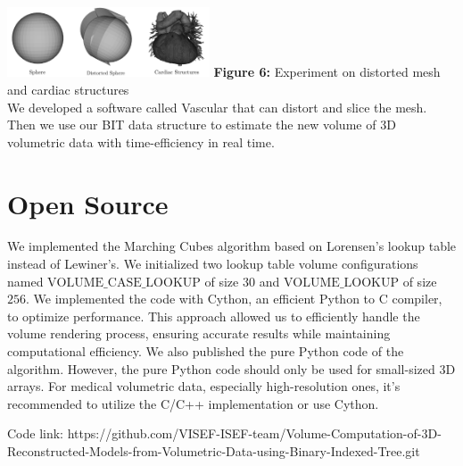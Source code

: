 \documentclass[11pt]{article}
\begin{document}
\begin{multicols}{2}
\includegraphics[width=0.45\textwidth]{Figures/Experiment.png}
\textbf{Figure 6:} Experiment on distorted mesh and cardiac structures \\

We developed a software called Vascular \cite{vascular} that can distort and slice the mesh. Then we use our BIT data structure to estimate the new volume of 3D volumetric data with time-efficiency in real time.  

\section{Open Source}
We implemented the Marching Cubes algorithm based on Lorensen's lookup table instead of Lewiner's. We initialized two lookup table volume configurations named $\text{VOLUME\_CASE\_LOOKUP}$ of size $30$ and $\text{VOLUME\_LOOKUP}$ of size $256$. We implemented the code with Cython, an efficient Python to C compiler, to optimize performance. This approach allowed us to efficiently handle the volume rendering process, ensuring accurate results while maintaining computational efficiency. We also published the pure Python code of the algorithm. However, the pure Python code should only be used for small-sized 3D arrays. For medical volumetric data, especially high-resolution ones, it's recommended to utilize the C/C++ implementation or use Cython.

Code link: https://github.com/VISEF-ISEF-team/Volume-Computation-of-3D-Reconstructed-Models-from-Volumetric-Data-using-Binary-Indexed-Tree.git

\newpage


\end{multicols}
\end{document}
